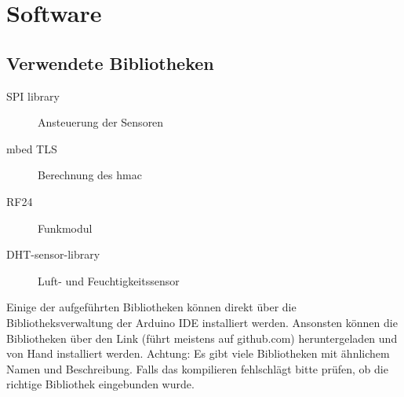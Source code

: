 \documentclass[
  12pt, %
  a4paper, %
  oneside, %
  openany, 
  numbers=noenddot, %
  BCOR=5mm, %
  parskip=half*, %
  thesis, %
]{bfhbook}
\begin{document}
 \section{Software}
 \subsection{Verwendete Bibliotheken}

  \begin{description}
\item[SPI library] Ansteuerung der Sensoren \cite{spi}
\item[mbed TLS] Berechnung des \Gls{hmac} \cite{mbedTLS}
\item[RF24] Funkmodul \cite{nrf24}
\item[DHT-sensor-library] Luft- und Feuchtigkeitssensor \cite{dht}
 \end{description}
Einige der aufgeführten Bibliotheken können direkt über die Bibliotheksverwaltung der Arduino IDE installiert werden. Ansonsten können die Bibliotheken über den Link (führt meistens auf github.com) heruntergeladen und von Hand installiert werden. 
{\color{red}Achtung: Es gibt viele Bibliotheken mit ähnlichem Namen und Beschreibung. Falls das kompilieren fehlschlägt bitte prüfen, ob die richtige Bibliothek eingebunden wurde.}
\end{document}
